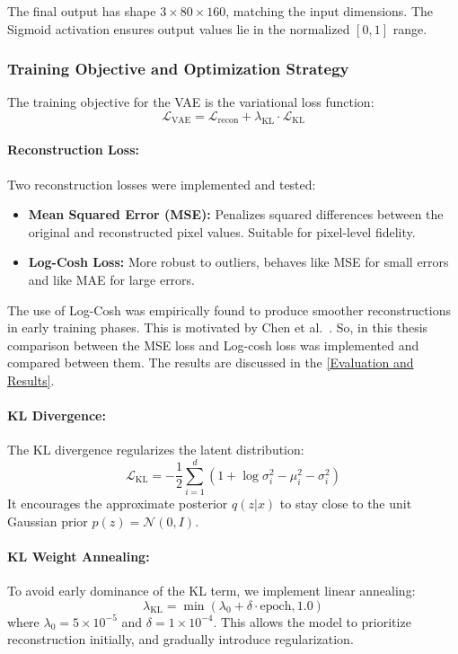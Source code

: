 The final output has shape $3 \times 80 \times 160$, matching the input dimensions. The Sigmoid activation ensures output values lie in the normalized $[0,1]$ range.

\subsubsection{Training Objective and Optimization Strategy} \label{subsubsec:vae_loss}

The training objective for the VAE is the variational loss function:
\[
\mathcal{L}_{\text{VAE}} = \mathcal{L}_{\text{recon}} + \lambda_{\text{KL}} \cdot \mathcal{L}_{\text{KL}}
\]

\paragraph{Reconstruction Loss:} \label{reconstruction_loss}
Two reconstruction losses were implemented and tested:
\begin{itemize}
    \item \textbf{Mean Squared Error (MSE):} Penalizes squared differences between the original and reconstructed pixel values. Suitable for pixel-level fidelity.
    \item \textbf{Log-Cosh Loss:} More robust to outliers, behaves like MSE for small errors and like MAE for large errors.
\end{itemize}
The use of Log-Cosh was empirically found to produce smoother reconstructions in early training phases. This is motivated by Chen et al.~\cite{chen2019log}. So, in this thesis comparison between the MSE loss and Log-cosh loss was implemented and compared between them. The results are discussed in the \cref{Evaluation and Results}.

\paragraph{KL Divergence:}
The KL divergence regularizes the latent distribution:
\[
\mathcal{L}_{\text{KL}} = -\frac{1}{2} \sum_{i=1}^{d} \left(1 + \log\sigma_i^2 - \mu_i^2 - \sigma_i^2\right)
\]
It encourages the approximate posterior $q(z|x)$ to stay close to the unit Gaussian prior $p(z) = \mathcal{N}(0, I)$.

\paragraph{KL Weight Annealing:}
To avoid early dominance of the KL term, we implement linear annealing:
\[
\lambda_{\text{KL}} = \min(\lambda_0 + \delta \cdot \text{epoch}, 1.0)
\]
where $\lambda_0 = 5 \times 10^{-5}$ and $\delta = 1 \times 10^{-4}$. This allows the model to prioritize reconstruction initially, and gradually introduce regularization.

